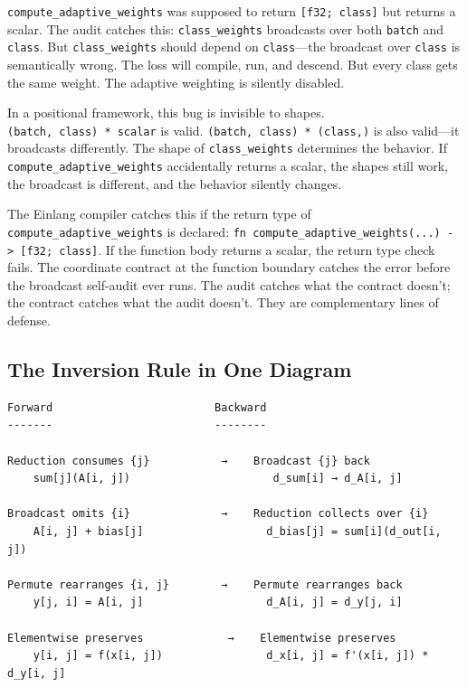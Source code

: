 \documentclass[11pt,titlepage]{article}
\begin{document}
\texttt{compute\_adaptive\_weights} was supposed to return
\texttt{{[}f32;\ class{]}} but returns a scalar. The audit catches this:
\texttt{class\_weights} broadcasts over both \texttt{batch} and
\texttt{class}. But \texttt{class\_weights} should depend on
\texttt{class}---the broadcast over \texttt{class} is semantically
wrong. The loss will compile, run, and descend. But every class gets the
same weight. The adaptive weighting is silently disabled.

In a positional framework, this bug is invisible to shapes.
\texttt{(batch,\ class)\ *\ scalar} is valid.
\texttt{(batch,\ class)\ *\ (class,)} is also valid---it broadcasts
differently. The shape of \texttt{class\_weights} determines the
behavior. If \texttt{compute\_adaptive\_weights} accidentally returns a
scalar, the shapes still work, the broadcast is different, and the
behavior silently changes.

The Einlang compiler catches this if the return type of
\texttt{compute\_adaptive\_weights} is declared:
\texttt{fn\ compute\_adaptive\_weights(...)\ -\textgreater{}\ {[}f32;\ class{]}}.
If the function body returns a scalar, the return type check fails. The
coordinate contract at the function boundary catches the error before
the broadcast self-audit ever runs. The audit catches what the contract
doesn't; the contract catches what the audit doesn't. They are
complementary lines of defense.

\vspace{2em}

\hypertarget{the-inversion-rule-in-one-diagram}{%
\subsection{The Inversion Rule in One
Diagram}\label{the-inversion-rule-in-one-diagram}}

\begin{verbatim}
Forward                         Backward
-------                         --------

Reduction consumes {j}           →    Broadcast {j} back
    sum[j](A[i, j])                      d_sum[i] → d_A[i, j]

Broadcast omits {i}              →    Reduction collects over {i}
    A[i, j] + bias[j]                   d_bias[j] = sum[i](d_out[i, j])

Permute rearranges {i, j}        →    Permute rearranges back
    y[j, i] = A[i, j]                   d_A[i, j] = d_y[j, i]

Elementwise preserves             →    Elementwise preserves
    y[i, j] = f(x[i, j])                d_x[i, j] = f'(x[i, j]) * d_y[i, j]
\end{verbatim}
\end{document}
